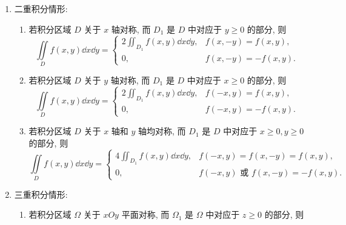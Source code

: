 \begin{theorem}[重积分的对称性]
    \begin{enumerate}[label=(\arabic{*})]
        \item 二重积分情形:
              \begin{enumerate}[label=(\roman{*})]
                  \item 若积分区域 $ D $ 关于 $ x $ 轴对称, 而 $ D_{1}$ 是 $ D $ 中对应于 $ y \geqslant 0 $ 的部分, 则
                        $$\iint\limits_{D} f(x, y) \dd  x \dd  y=\begin{cases}
                                2 \displaystyle\iint_{D_{1}} f(x, y) \dd  x \dd  y, & f(x,-y)=f(x, y),   \\
                                0,                                                  & f(x,-y)=-f(x, y) .
                            \end{cases}$$
                  \item 若积分区域 $ D $ 关于 $ y $ 轴对称, 而 $ D_{1} $ 是 $ D $ 中对应于 $ x \geqslant 0 $ 的部分, 则
                        $$\iint\limits_{D} f(x, y) \dd  x \dd  y=\begin{cases}
                                2 \displaystyle\iint_{D_{1}} f(x, y) \dd  x \dd  y, & f(-x, y)=f(x, y),   \\
                                0,                                                  & f(-x, y)=-f(x, y) .
                            \end{cases}$$
                  \item 若积分区域 $ D $ 关于 $ x $ 轴和 $ y $ 轴均对称, 而 $ D_{1} $ 是 $ D $ 中对应于 $ x \geqslant 0, y \geqslant 0 $ 的部分, 则
                        $$\iint\limits_{D} f(x, y) \dd  x \dd  y=\begin{cases}
                                4 \displaystyle\iint_{D_{1}} f(x, y) \dd  x \dd  y, & f(-x, y)=f(x,-y)=f(x, y),                \\
                                0,                                                  & f(-x, y) \text { 或 } f(x,-y)=-f(x, y) .
                            \end{cases}$$
              \end{enumerate}
        \item 三重积分情形:
              \begin{enumerate}[label=(\roman{*})]
                  \item 若积分区域 $ \Omega $ 关于 $ x O y $ 平面对称, 而 $ \Omega_{1} $ 是 $ \Omega $ 中对应于 $ z \geqslant 0 $ 的部分, 则

\end{enumerate}
\end{enumerate}
\end{theorem}
